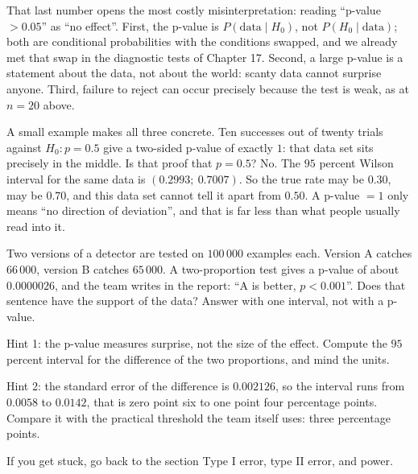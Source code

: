 That last number opens the most costly misinterpretation: reading ``p-value
$>0.05$'' as ``no effect''. First, the p-value is
$P(\text{data}\mid H_0)$, not $P(H_0\mid\text{data})$; both are conditional probabilities
with the conditions swapped, and we already met that swap in the diagnostic tests of
Chapter 17. Second, a large p-value is a statement about the data, not about the world: scanty
data cannot surprise anyone. Third, failure to reject can occur precisely because the test is
weak, as at $n=20$ above.

A small example makes all three concrete. Ten successes out of twenty trials against
$H_0\colon p=0.5$ give a two-sided p-value of exactly $1$: that data set sits
precisely in the middle. Is that proof that $p=0.5$? No. The $95$ percent Wilson interval
for the same data is $(0.2993;\ 0.7007)$. So the true rate may be
$0.30$, may be $0.70$, and this data set cannot tell it apart from $0.50$.
A p-value $=1$ only means ``no direction of deviation'', and that is far less than what people
usually read into it.

\begin{tantangan}
Two versions of a detector are tested on \mbox{$100\,000$} examples each. Version A catches
\mbox{$66\,000$}, version B catches \mbox{$65\,000$}. A two-proportion test gives a p-value of about
$0.0000026$, and the team writes in the report: ``A is better, $p<0.001$''. Does that
sentence have the support of the data? Answer with one interval, not with a p-value.

Hint 1: the p-value measures surprise, not the size of the effect. Compute the $95$ percent
interval for the difference of the two proportions, and mind the units.

Hint 2: the standard error of the difference is $0.002126$, so the interval runs from
$0.0058$ to $0.0142$, that is zero point six to one point four percentage points.
Compare it with the practical threshold the team itself uses: three percentage points.

If you get stuck, go back to the section Type I error, type II error, and power.
\end{tantangan}

